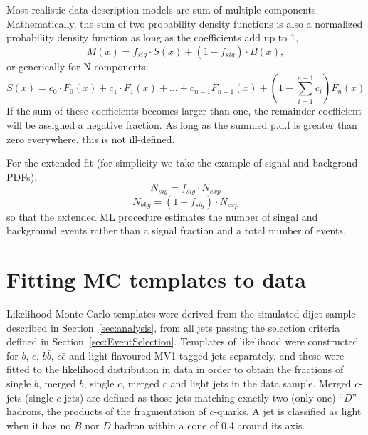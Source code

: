 
Most realistic data description models are sum of multiple components. Mathematically, the sum of two probability density functions is  also a normalized probability density function as  long as the coefficients add up to 1, %
%
\begin{equation}
M(x) = f_{sig} \cdot S(x) + (1-f_{sig}) \cdot B(x),
\end{equation}
%
or generically for N components:
%
\begin{equation}
S(x) = c_0 \cdot F_0(x) + c_1 \cdot F_1(x)+...+c_{n-1}F_{n-1}(x)+ (1-\sum^{n-1}_{i=1}c_i) F_n(x)
\end{equation}
%
If the sum of these coefficients becomes larger than one, the remainder coefficient will be assigned a negative fraction. As long as the summed p.d.f is greater than zero everywhere, this is not ill-defined. %

For the extended fit (for simplicity we take the example of signal and backgrond PDFs), 
%
\begin{equation}
N_{sig} = f_{sig} \cdot N_{exp}
\end{equation}
%
\begin{equation}
N_{bkg} = (1-f_{sig}) \cdot N_{exp}
\end{equation}
%
so that the extended ML procedure estimates the number of singal and background events rather than a signal fraction and a total number of events.




\section{Fitting MC templates to data}\label{sec:FitsResults}



Likelihood Monte Carlo templates were derived from the simulated dijet sample described in Section~\ref{sec:analysis}, from all jets passing the selection criteria defined in Section~\ref{sec:EventSelection}. Templates of likelihood were constructed for $b$, $c$, $b\bar{b}$, $c\bar{c}$ and light flavoured MV1 tagged jets separately, and these were fitted to the likelihood distribution in data in order to obtain the fractions of single $b$, merged $b$, single $c$, merged $c$ and light jets in the data sample. Merged $c$-jets (single $c$-jets) are defined as those jets matching exactly two (only one) ``$D$'' hadrons, the products of the fragmentation of $c$-quarks. A jet is classified as light when it has no $B$ nor $D$ hadron within a cone of 0.4 around its axis.

